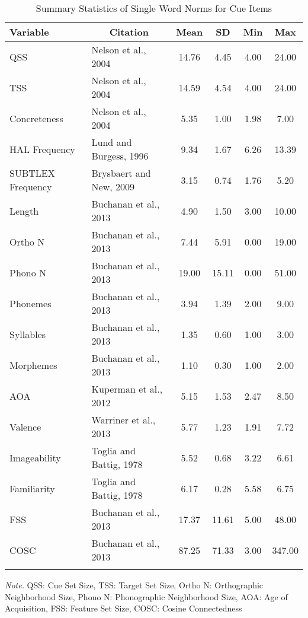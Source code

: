 \documentclass[english,man]{apa6}
\theoremstyle{definition}
\theoremstyle{definition}
\theoremstyle{definition}
\theoremstyle{remark}
\begin{document}
\begin{table}[tbp]
\begin{center}
\begin{threeparttable}
\caption{\label{tab:stim-table-cue}Summary Statistics of Single Word Norms for Cue Items}
\begin{tabular}{llcccc}
\toprule
Variable & \multicolumn{1}{c}{Citation} & \multicolumn{1}{c}{Mean} & \multicolumn{1}{c}{SD} & \multicolumn{1}{c}{Min} & \multicolumn{1}{c}{Max}\\
\midrule
QSS & Nelson et al., 2004 & 14.76 & 4.45 & 4.00 & 24.00\\
TSS & Nelson et al., 2004 & 14.59 & 4.54 & 4.00 & 24.00\\
Concreteness & Nelson et al., 2004 & 5.35 & 1.00 & 1.98 & 7.00\\
HAL Frequency & Lund and Burgess, 1996 & 9.34 & 1.67 & 6.26 & 13.39\\
SUBTLEX Frequency & Brysbaert and New, 2009 & 3.15 & 0.74 & 1.76 & 5.20\\
Length & Buchanan et al., 2013 & 4.90 & 1.50 & 3.00 & 10.00\\
Ortho N & Buchanan et al., 2013 & 7.44 & 5.91 & 0.00 & 19.00\\
Phono N & Buchanan et al., 2013 & 19.00 & 15.11 & 0.00 & 51.00\\
Phonemes & Buchanan et al., 2013 & 3.94 & 1.39 & 2.00 & 9.00\\
Syllables & Buchanan et al., 2013 & 1.35 & 0.60 & 1.00 & 3.00\\
Morphemes & Buchanan et al., 2013 & 1.10 & 0.30 & 1.00 & 2.00\\
AOA & Kuperman et al., 2012 & 5.15 & 1.53 & 2.47 & 8.50\\
Valence & Warriner et al., 2013 & 5.77 & 1.23 & 1.91 & 7.72\\
Imageability & Toglia and Battig, 1978 & 5.52 & 0.68 & 3.22 & 6.61\\
Familiarity & Toglia and Battig, 1978 & 6.17 & 0.28 & 5.58 & 6.75\\
FSS & Buchanan et al., 2013 & 17.37 & 11.61 & 5.00 & 48.00\\
COSC & Buchanan et al., 2013 & 87.25 & 71.33 & 3.00 & 347.00\\
\bottomrule
\addlinespace
\end{tabular}
\begin{tablenotes}[para]
\textit{Note.} QSS: Cue Set Size, TSS: Target Set Size, Ortho N: Orthographic Neighborhood Size, Phono N: Phonographic Neighborhood Size, AOA: Age of Acquisition, FSS: Feature Set Size, COSC: Cosine Connectedness
\end{tablenotes}
\end{threeparttable}
\end{center}
\end{table}
\end{document}
